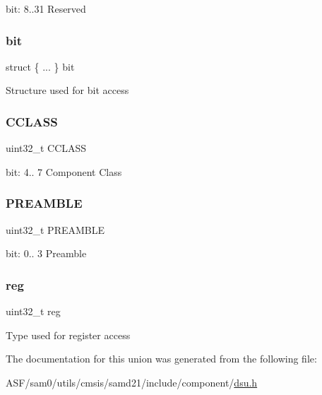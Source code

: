 bit\+: 8..31 Reserved \mbox{\label{union_d_s_u___c_i_d1___type_a9add182fe818ea788adf01c6647c6e4b}} 
\subsubsection{\texorpdfstring{bit}{bit}}
{\footnotesize\ttfamily struct \{ ... \}   bit}

Structure used for bit access \mbox{\label{union_d_s_u___c_i_d1___type_a0f282950c422fa65010971d88a119b3d}} 
\subsubsection{\texorpdfstring{CCLASS}{CCLASS}}
{\footnotesize\ttfamily uint32\+\_\+t C\+C\+L\+A\+SS}

bit\+: 4.. 7 Component Class \mbox{\label{union_d_s_u___c_i_d1___type_a893904fe60cf02df2807ebb258b67857}} 
\subsubsection{\texorpdfstring{PREAMBLE}{PREAMBLE}}
{\footnotesize\ttfamily uint32\+\_\+t P\+R\+E\+A\+M\+B\+LE}

bit\+: 0.. 3 Preamble \mbox{\label{union_d_s_u___c_i_d1___type_a6b91636401516a477989a336376d7b40}} 
\subsubsection{\texorpdfstring{reg}{reg}}
{\footnotesize\ttfamily uint32\+\_\+t reg}

Type used for register access 

The documentation for this union was generated from the following file\+:\begin{DoxyCompactItemize}
\item 
A\+S\+F/sam0/utils/cmsis/samd21/include/component/\mbox{\hyperlink{component_2dsu_8h}{dsu.\+h}}\end{DoxyCompactItemize}
